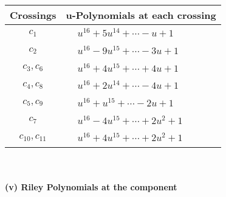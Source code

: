 \documentclass[1p]{elsarticle_modified}
\theoremstyle{definition}
\begin{document}
\begin{tabular}{m{50pt}|m{274pt}}
Crossings & \hspace{64pt}u-Polynomials at each crossing \\
\hline $$\begin{aligned}c_{1}\end{aligned}$$&$\begin{aligned}
&u^{16}+5 u^{14}+\cdots- u+1
\end{aligned}$\\
\hline $$\begin{aligned}c_{2}\end{aligned}$$&$\begin{aligned}
&u^{16}-9 u^{15}+\cdots-3 u+1
\end{aligned}$\\
\hline $$\begin{aligned}c_{3},c_{6}\end{aligned}$$&$\begin{aligned}
&u^{16}+4 u^{15}+\cdots+4 u+1
\end{aligned}$\\
\hline $$\begin{aligned}c_{4},c_{8}\end{aligned}$$&$\begin{aligned}
&u^{16}+2 u^{14}+\cdots-4 u+1
\end{aligned}$\\
\hline $$\begin{aligned}c_{5},c_{9}\end{aligned}$$&$\begin{aligned}
&u^{16}+u^{15}+\cdots-2 u+1
\end{aligned}$\\
\hline $$\begin{aligned}c_{7}\end{aligned}$$&$\begin{aligned}
&u^{16}-4 u^{15}+\cdots+2 u^2+1
\end{aligned}$\\
\hline $$\begin{aligned}c_{10},c_{11}\end{aligned}$$&$\begin{aligned}
&u^{16}+4 u^{15}+\cdots+2 u^2+1
\end{aligned}$\\
\hline
\end{tabular}\\~\\
\newpage\renewcommand{\arraystretch}{1}
\flushleft \textbf{(v) Riley Polynomials at the component}\newline \\
\end{document}
